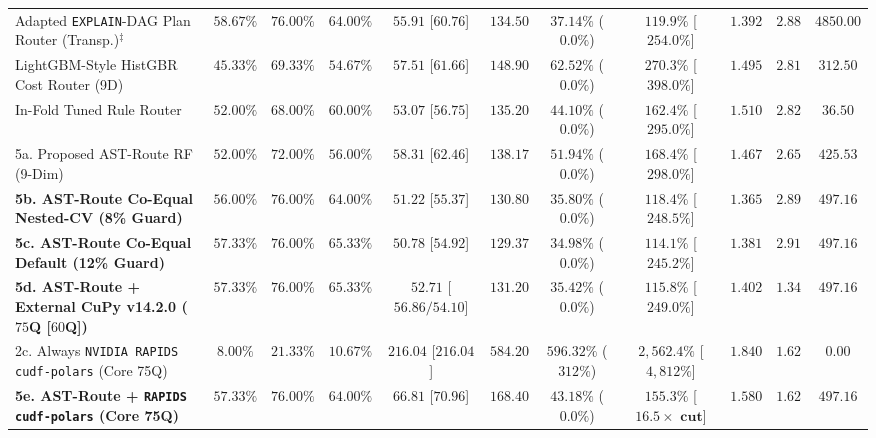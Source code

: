 \documentclass[10pt,a4paper]{article}
\newenvironment{fitasttable}{%
  \begin{lrbox}{\asttblbox}%
}{%
  \end{lrbox}%
  \sbox{\asttblboxB}{%
    \ifdim\wd\asttblbox>0.96\textwidth
      \resizebox{0.96\textwidth}{!}{\usebox{\asttblbox}}%
    \else
      \usebox{\asttblbox}%
    \fi
  }%
  \ifdim\ht\asttblboxB>0.72\textheight
    \resizebox{!}{0.72\textheight}{\usebox{\asttblboxB}}%
  \else
    \usebox{\asttblboxB}%
  \fi
}
\begin{document}
\begin{table}[!htbp]
\begin{fitasttable}
\begin{tabular}{@{}lcccccccccc@{}}
Adapted \texttt{EXPLAIN}-DAG Plan Router (Transp.)$^{\ddagger}$ & $58.67\%$ & $76.00\%$ & $64.00\%$ & $55.91$ [$60.76$] & $134.50$ & $37.14\%$ ($0.0\%$) & $119.9\%$ [$254.0\%$] & $1.392$ & $2.88$ & $4850.00$ \\
LightGBM-Style HistGBR Cost Router (9D) & $45.33\%$ & $69.33\%$ & $54.67\%$ & $57.51$ [$61.66$] & $148.90$ & $62.52\%$ ($0.0\%$) & $270.3\%$ [$398.0\%$] & $1.495$ & $2.81$ & $312.50$ \\
In-Fold Tuned Rule Router & $52.00\%$ & $68.00\%$ & $60.00\%$ & $53.07$ [$56.75$] & $135.20$ & $44.10\%$ ($0.0\%$) & $162.4\%$ [$295.0\%$] & $1.510$ & $2.82$ & $36.50$ \\
5a. Proposed AST-Route RF (9-Dim) & $52.00\%$ & $72.00\%$ & $56.00\%$ & $58.31$ [$62.46$] & $138.17$ & $51.94\%$ ($0.0\%$) & $168.4\%$ [$298.0\%$] & $1.467$ & $2.65$ & $425.53$ \\
\textbf{5b. AST-Route Co-Equal Nested-CV (8\% Guard)} & $\mathbf{56.00\%}$ & $\mathbf{76.00\%}$ & $\mathbf{64.00\%}$ & $\mathbf{51.22}$ [$\mathbf{55.37}$] & $\mathbf{130.80}$ & $\mathbf{35.80\%}$ ($\mathbf{0.0\%}$) & $\mathbf{118.4\%}$ [$\mathbf{248.5\%}$] & $\mathbf{1.365}$ & $\mathbf{2.89}$ & $\mathbf{497.16}$ \\
\textbf{5c. AST-Route Co-Equal Default (12\% Guard)} & $\mathbf{57.33\%}$ & $\mathbf{76.00\%}$ & $\mathbf{65.33\%}$ & $\mathbf{50.78}$ [$\mathbf{54.92}$] & $\mathbf{129.37}$ & $\mathbf{34.98\%}$ ($\mathbf{0.0\%}$) & $\mathbf{114.1\%}$ [$\mathbf{245.2\%}$] & $\mathbf{1.381}$ & $\mathbf{2.91}$ & $\mathbf{497.16}$ \\
\textbf{5d. AST-Route + External CuPy v14.2.0 ($75$Q [$60$Q])} & $\mathbf{57.33\%}$ & $\mathbf{76.00\%}$ & $\mathbf{65.33\%}$ & $\mathbf{52.71}$ [$\mathbf{56.86 / 54.10}$] & $\mathbf{131.20}$ & $\mathbf{35.42\%}$ ($\mathbf{0.0\%}$) & $\mathbf{115.8\%}$ [$\mathbf{249.0\%}$] & $\mathbf{1.402}$ & $\mathbf{1.34}$ & $\mathbf{497.16}$ \\
2c. Always \texttt{NVIDIA RAPIDS cudf-polars} (Core 75Q) & $8.00\%$ & $21.33\%$ & $10.67\%$ & $216.04$ [$216.04$] & $584.20$ & $596.32\%$ ($312\%$) & $2{,}562.4\%$ [$4{,}812\%$] & $1.840$ & $1.62$ & $0.00$ \\
\textbf{5e. AST-Route + \texttt{RAPIDS cudf-polars} (Core 75Q)} & $\mathbf{57.33\%}$ & $\mathbf{76.00\%}$ & $\mathbf{64.00\%}$ & $\mathbf{66.81}$ [$\mathbf{70.96}$] & $\mathbf{168.40}$ & $\mathbf{43.18\%}$ ($\mathbf{0.0\%}$) & $\mathbf{155.3\%}$ [$\mathbf{16.5\times\text{ cut}}$] & $\mathbf{1.580}$ & $\mathbf{1.62}$ & $\mathbf{497.16}$ \\

\end{tabular}
\end{fitasttable}
\end{table}
\end{document}
